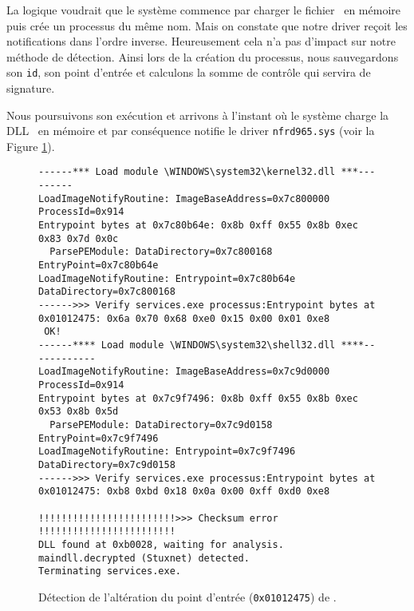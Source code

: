 La logique voudrait que le système commence par charger le fichier \service\ en mémoire puis crée un processus du même nom. Mais on constate que notre driver reçoit les notifications dans l'ordre inverse. Heureusement cela n'a pas d'impact sur notre méthode de détection. Ainsi lors de la création du processus, nous sauvegardons son \texttt{id}, son point d'entrée et calculons la somme de contrôle qui servira de signature.  

Nous poursuivons son exécution et arrivons à l'instant où le système charge la DLL \krn\ en mémoire et par conséquence notifie le driver \texttt{nfrd965.sys} (voir la Figure \ref{fig:AThierry_Breakpoint2}).

\begin{figure}
\scriptsize
\begin{changemargin}{-1cm}{-1cm}
\begin{lstlisting}[language={}]
------*** Load module \WINDOWS\system32\kernel32.dll ***---------
LoadImageNotifyRoutine: ImageBaseAddress=0x7c800000 ProcessId=0x914 
Entrypoint bytes at 0x7c80b64e: 0x8b 0xff 0x55 0x8b 0xec 0x83 0x7d 0x0c
  ParsePEModule: DataDirectory=0x7c800168 EntryPoint=0x7c80b64e
LoadImageNotifyRoutine: Entrypoint=0x7c80b64e DataDirectory=0x7c800168 
------>>> Verify services.exe processus:Entrypoint bytes at 0x01012475: 0x6a 0x70 0x68 0xe0 0x15 0x00 0x01 0xe8
 OK!
------**** Load module \WINDOWS\system32\shell32.dll ****------------
LoadImageNotifyRoutine: ImageBaseAddress=0x7c9d0000 ProcessId=0x914 
Entrypoint bytes at 0x7c9f7496: 0x8b 0xff 0x55 0x8b 0xec 0x53 0x8b 0x5d
  ParsePEModule: DataDirectory=0x7c9d0158 EntryPoint=0x7c9f7496
LoadImageNotifyRoutine: Entrypoint=0x7c9f7496 DataDirectory=0x7c9d0158 
------>>> Verify services.exe processus:Entrypoint bytes at 0x01012475: 0xb8 0xbd 0x18 0x0a 0x00 0xff 0xd0 0xe8

!!!!!!!!!!!!!!!!!!!!!!!!>>> Checksum error !!!!!!!!!!!!!!!!!!!!!!!!
DLL found at 0xb0028, waiting for analysis.
maindll.decrypted (Stuxnet) detected.
Terminating services.exe.
\end{lstlisting}
\end{changemargin}
\caption{Détection de l'altération du point d'entrée (\texttt{0x01012475}) de \texttt{\service}.\label{fig:AThierry_Breakpoint2}}
\end{figure}

